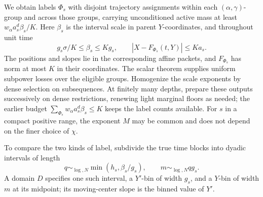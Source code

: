 We obtain labels \(\Phi_s\) with disjoint trajectory assignments
within each \((\alpha,\gamma)\)-group and across those groups,
carrying unconditioned
active mass at least \(w_\alpha a_s^d\beta_s/K\).  Here
\(\beta_s\) is the interval scale in parent \(Y\)-coordinates,
and throughout unit time
\[
 g_s\sigma/K\le\beta_s\le Kg_s,
 \qquad |X-F_{\Phi_s}(t,Y)|\le Ka_s.
\]
The positions and slopes lie in the corresponding affine packets,
and \(F_{\Phi_s}\) has norm at most \(K\) in their coordinates.
The scalar theorem supplies uniform subpower losses over the eligible
groups.  Homogenize the scale exponents by dense selection on
subsequences.  At finitely many depths, prepare these outputs
successively on dense restrictions, renewing light marginal floors
as needed; the earlier budget
\(\sum_{\Phi_s}w_\alpha a_s^d\beta_s\le K\) keeps the label
counts available.  For \(s\) in a compact positive range, the
exponent \(M\) may be common and does not depend on the finer
choice of \(\chi\).


To compare the two kinds of label, subdivide the true time blocks
into dyadic intervals of length
\[
 q\sim_{\log,N}\min(h_s,\beta_s/g_s),\qquad m\sim_{\log,N}qg_s.
\]
A domain \(D\) specifies one such interval, a \(Y'\)-bin of width
\(g_s\), and a \(Y\)-bin of width \(m\) at its midpoint; its
moving-center slope is the binned value of \(Y'\).

